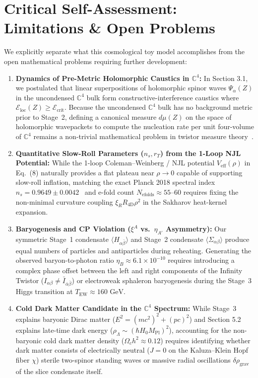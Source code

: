 \documentclass[11pt,a4paper]{article}
\begin{document}
\section{Critical Self-Assessment: Limitations \& Open Problems}

We explicitly separate what this cosmological toy model accomplishes from the open mathematical problems requiring further development:
\begin{enumerate}
    \item \textbf{Dynamics of Pre-Metric Holomorphic Caustics in $\mathbb{C}^4$:}
    In Section 3.1, we postulated that linear superpositions of holomorphic spinor waves $\Psi_\alpha(Z)$ in the uncondensed $\mathbb{C}^4$ bulk form constructive-interference caustics where $\mathcal{E}_{\text{loc}}(Z) \ge \mathcal{E}_{\text{crit}}$. Because the uncondensed $\mathbb{C}^4$ bulk has no background metric prior to Stage~2, defining a canonical measure $d\mu(Z)$ on the space of holomorphic wavepackets to compute the nucleation rate per unit four-volume of $\mathbb{C}^4$ remains a non-trivial mathematical problem in twistor measure theory~\cite{PenroseRindler1984}.
    \item \textbf{Quantitative Slow-Roll Parameters ($n_s, r_T$) from the 1-Loop NJL Potential:}
    While the 1-loop Coleman--Weinberg / NJL potential $V_{\text{eff}}(\rho)$ in Eq.\ (8) naturally provides a flat plateau near $\rho \to 0$ capable of supporting slow-roll inflation, matching the exact Planck 2018 spectral index $n_s = 0.9649 \pm 0.0042$~\cite{Planck2018} and e-fold count $N_{\text{efolds}} \approx 55\text{--}60$ requires fixing the non-minimal curvature coupling $\xi_R R_{4\text{D}}\rho^2$ in the Sakharov heat-kernel expansion.
    \item \textbf{Baryogenesis and CP Violation ($\xi^A$ vs.\ $\eta_{A'}$ Asymmetry):}
    Our symmetric Stage~1 condensate $\langle H_{\alpha\bar{\beta}}\rangle$ and Stage~2 condensate $\langle\Sigma_{\alpha\beta}\rangle$ produce equal numbers of particles and antiparticles during reheating. Generating the observed baryon-to-photon ratio $\eta_B \approx 6.1 \times 10^{-10}$ requires introducing a complex phase offset between the left and right components of the Infinity Twistor ($I_{\alpha\beta} \neq \bar{I}_{\bar{\alpha}\bar{\beta}}$) or electroweak sphaleron baryogenesis during the Stage~3 Higgs transition at $T_{\text{EW}} \approx 160\text{ GeV}$.
    \item \textbf{Cold Dark Matter Candidate in the $\mathbb{C}^4$ Spectrum:}
    While Stage~3 explains baryonic Dirac matter ($E^2 = (mc^2)^2 + (pc)^2$) and Section 5.2 explains late-time dark energy ($\rho_\Lambda \sim (\hbar H_0 M_{\text{Pl}})^2$), accounting for the non-baryonic cold dark matter density ($\Omega_c h^2 \approx 0.12$) requires identifying whether dark matter consists of electrically neutral ($J = 0$ on the Kaluza--Klein Hopf fiber $\chi$) sterile two-spinor standing waves or massive radial oscillations $\delta\rho_{\text{grav}}$ of the slice condensate itself.
\end{enumerate}
\end{document}
